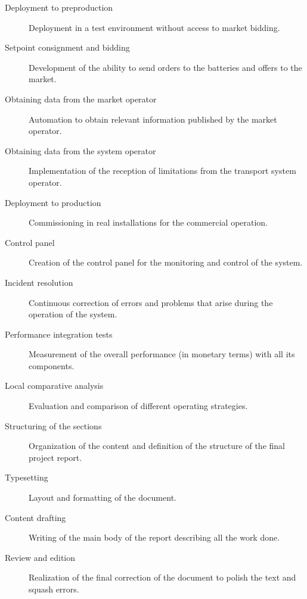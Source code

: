 \begin{description}
  \item[Deployment to preproduction] Deployment in a test environment without access to market bidding.

  \item[Setpoint consignment and bidding] Development of the ability to send orders to the batteries and offers to the market.

  \item[Obtaining data from the market operator] Automation to obtain relevant information published by the market operator.

  \item[Obtaining data from the system operator] Implementation of the reception of limitations from the transport system operator.

  \item[Deployment to production] Commissioning in real installations for the commercial operation.

  \item[Control panel] Creation of the control panel for the monitoring and control of the system.

  \item[Incident resolution] Continuous correction of errors and problems that arise during the operation of the system.

  \item[Performance integration tests] Measurement of the overall performance (in monetary terms) with all its components.

  \item[Local comparative analysis] Evaluation and comparison of different operating strategies.

  \item[Structuring of the sections] Organization of the content and definition of the structure of the final project report.

  \item[Typesetting] Layout and formatting of the document.

  \item[Content drafting] Writing of the main body of the report describing all the work done.

  \item[Review and edition] Realization of the final correction of the document to polish the text and squash errors.

\end{description}
